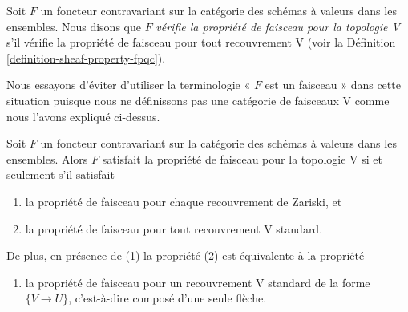 \begin{definition}
\label{definition-sheaf-property-V}
Soit $F$ un foncteur contravariant sur la catégorie des schémas à valeurs dans les ensembles. Nous disons que $F$ {\it vérifie la propriété de faisceau pour la topologie V} s'il vérifie la propriété de faisceau pour tout recouvrement V (voir la Définition \ref{definition-sheaf-property-fpqc}).
\end{definition}

\noindent
Nous essayons d'éviter d'utiliser la terminologie « $F$ est un faisceau » dans cette situation puisque nous ne définissons pas une catégorie de faisceaux V comme nous l'avons expliqué ci-dessus.

\begin{lemma}
\label{lemma-sheaf-property-V}
Soit $F$ un foncteur contravariant sur la catégorie des schémas à valeurs dans les ensembles. Alors $F$ satisfait la propriété de faisceau pour la topologie V si et seulement s'il satisfait
\begin{enumerate}
\item la propriété de faisceau pour chaque recouvrement de Zariski, et
\item la propriété de faisceau pour tout recouvrement V standard.
\end{enumerate}
De plus, en présence de (1) la propriété (2) est équivalente à la propriété
\begin{enumerate}
\item[(2')] la propriété de faisceau pour un recouvrement V standard de la forme $\{V \to U\}$, c'est-à-dire composé d'une seule flèche.
\end{enumerate}
\end{lemma}

